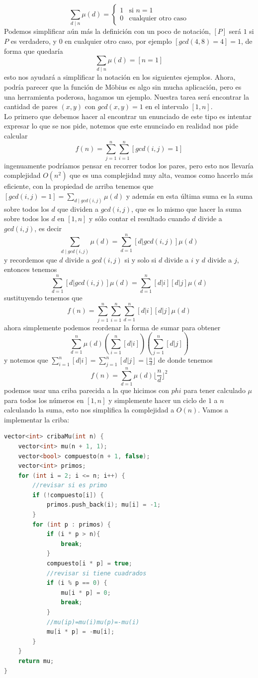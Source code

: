 \[\sum_{d \mid n} \mu(d)
 = \begin{cases}
1  & \text{si } n = 1 \\
0  & \text{cualquier otro caso} 
\end{cases}
\]
Podemos simplificar aún más la definición con un poco de notación, $[P]$ será $1$ si $P$ es verdadero, y 0 en cualquier otro caso, por ejemplo $[gcd(4,8)=4]=1$, de forma que quedaría
\[\sum_{d \mid n} \mu(d)=[n=1]\]
esto nos ayudará a simplificar la notación en los siguientes ejemplos. Ahora, podría parecer que la función de Möbius es algo sin mucha aplicación, pero es una herramienta poderosa, hagamos un ejemplo. Nuestra tarea será encontrar la cantidad de pares $(x,y)$ con $gcd(x,y)=1$ en el intervalo $[1,n]$.
\\Lo primero que debemos hacer al encontrar un enunciado de este tipo es intentar expresar lo que se nos pide, notemos que este enunciado en realidad nos pide calcular
\[f(n)=\sum_{j=1}^{n} \sum_{i=1}^{n} [gcd(i,j)=1]\]
ingenuamente podríamos pensar en recorrer todos los pares, pero esto nos llevaría complejidad $O(n^2)$ que es una complejidad muy alta, veamos como hacerlo más eficiente, con la propiedad de arriba tenemos que $[gcd(i,j)=1]=\sum_{d \mid gcd(i,j)} \mu(d)$ y además en esta última suma es la suma sobre todos los $d$ que dividen a $gcd(i,j)$, que es lo mismo que hacer la suma sobre todos los $d$ en $[1,n]$ y sólo contar el resultado cuando $d$ divide a $gcd(i,j)$, es decir
\[\sum_{d \mid gcd(i,j)} \mu(d)=\sum_{d =1}^n [d|gcd(i,j)]\mu(d)\]
y recordemos que $d$ divide a $gcd(i,j)$ si y solo si $d$ divide a $i$ y $d$ divide a $j$, entonces tenemos
\[\sum_{d =1}^n [d|gcd(i,j)]\mu(d)=\sum_{d =1}^n [d|i][d|j]\mu(d)\]
sustituyendo tenemos que
\[f(n)=\sum_{j=1}^{n} \sum_{i=1}^{n} \sum_{d =1}^n [d|i][d|j]\mu(d)\]
ahora simplemente podemos reordenar la forma de sumar para obtener
\[\sum_{d =1}^n \mu(d)(\sum_{i =1}^n [d|i])(\sum_{j =1}^n [d|j])\]
y notemos que $\sum_{i =1}^n [d|i]=\sum_{j =1}^n [d|j]=\lfloor \frac{n}{d} \rfloor$ de donde tenemos
\[f(n)=\sum_{d =1}^n \mu(d)\lfloor \frac{n}{d} \rfloor^2\]
podemos usar una criba parecida a la que hicimos con $phi$ para tener calculado $\mu$ para todos los números en $[1,n]$ y simplemente hacer un ciclo de $1$ a $n$ calculando la suma, esto nos simplifica la complejidad a $O(n)$. Vamos a implementar la criba:

\begin{lstlisting}[language=C++]
vector<int> cribaMu(int n) {
    vector<int> mu(n + 1, 1);
    vector<bool> compuesto(n + 1, false);
    vector<int> primos;
    for (int i = 2; i <= n; i++) {
        //revisar si es primo
        if (!compuesto[i]) { 
            primos.push_back(i); mu[i] = -1;
        }
        for (int p : primos) {
            if (i * p > n){
                break;
            }
            compuesto[i * p] = true;
            //revisar si tiene cuadrados
            if (i % p == 0) {
                mu[i * p] = 0;
                break;
            }
            //mu(ip)=mu(i)mu(p)=-mu(i)
            mu[i * p] = -mu[i];
        }
    }
    return mu;
}
\end{lstlisting}
